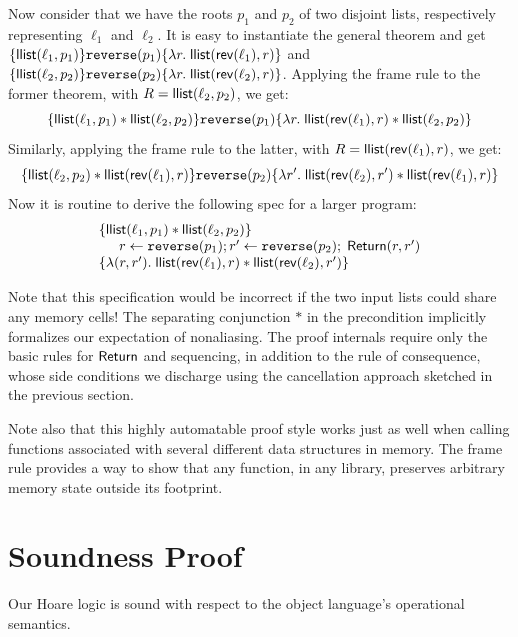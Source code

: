 \documentclass{amsbook}
\theoremstyle{definition}
\theoremstyle{remark}
\numberwithin{section}{chapter}
\numberwithin{equation}{chapter}
\begin{document}
Now consider that we have the roots $p_1$ and $p_2$ of two disjoint lists, respectively representing $\ell_1$ and $\ell_2$.
It is easy to instantiate the general theorem and get $\{\mathsf{llist}(\ell_1, p_1)\} \texttt{reverse}(p_1) \{\lambda r. \; \mathsf{llist}(\mathsf{rev}(\ell_1), r)\}$ and $\{\mathsf{llist}(\ell_2, p_2)\} \texttt{reverse}(p_2) \{\lambda r. \; \mathsf{llist}(\mathsf{rev}(\ell_2), r)\}$.
Applying the frame rule to the former theorem, with $R = \mathsf{llist}(\ell_2, p_2)$, we get:
$$\{\mathsf{llist}(\ell_1, p_1) * \mathsf{llist}(\ell_2, p_2)\} \texttt{reverse}(p_1) \{\lambda r. \; \mathsf{llist}(\mathsf{rev}(\ell_1), r) * \mathsf{llist}(\ell_2, p_2)\}$$
Similarly, applying the frame rule to the latter, with $R = \mathsf{llist}(\mathsf{rev}(\ell_1), r)$, we get:
$$\{\mathsf{llist}(\ell_2, p_2) * \mathsf{llist}(\mathsf{rev}(\ell_1), r)\} \texttt{reverse}(p_2) \{\lambda r'. \; \mathsf{llist}(\mathsf{rev}(\ell_2), r') * \mathsf{llist}(\mathsf{rev}(\ell_1), r)\}$$
Now it is routine to derive the following spec for a larger program:
$$\begin{array}{l}
  \{\mathsf{llist}(\ell_1, p_1) * \mathsf{llist}(\ell_2, p_2)\} \\
  \hspace{.2in} r \leftarrow \texttt{reverse}(p_1); r' \leftarrow \texttt{reverse}(p_2); \; \mathsf{Return}(r, r') \\
  \{\lambda (r, r'). \; \mathsf{llist}(\mathsf{rev}(\ell_1), r) * \mathsf{llist}(\mathsf{rev}(\ell_2), r')\}
\end{array}$$

Note that this specification would be incorrect if the two input lists could share any memory cells!
The separating conjunction $*$ in the precondition implicitly formalizes our expectation of nonaliasing.
The proof internals require only the basic rules for $\mathsf{Return}$ and sequencing, in addition to the rule of consequence, whose side conditions we discharge using the cancellation approach sketched in the previous section.

Note also that this highly automatable proof style works just as well when calling functions associated with several different data structures in memory.
The frame rule provides a way to show that any function, in any library, preserves arbitrary memory state outside its footprint.

\section{Soundness Proof}

Our Hoare logic is sound with respect to the object language's operational semantics.
\end{document}
